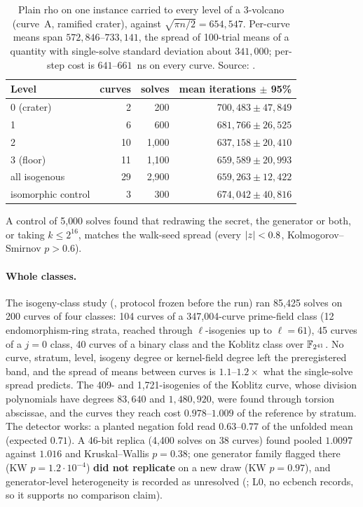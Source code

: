 \begin{table}[t]
\centering\small
\begin{tabular}{@{}lrrr@{}}
\toprule
Level & curves & solves & mean iterations $\pm$ 95\% \\
\midrule
0 (crater) & 2 & 200 & $700{,}483\pm47{,}849$ \\
1 & 6 & 600 & $681{,}766\pm26{,}525$ \\
2 & 10 & 1{,}000 & $637{,}158\pm20{,}410$ \\
3 (floor) & 11 & 1{,}100 & $659{,}589\pm20{,}993$ \\
all isogenous & 29 & 2{,}900 & $659{,}263\pm12{,}422$ \\
isomorphic control & 3 & 300 & $674{,}042\pm40{,}816$ \\
\bottomrule
\end{tabular}
\caption[]{Plain rho on one instance carried to every level of a 3-volcano
(curve~A, ramified crater), against $\sqrt{\pi n/2}=654{,}547$. Per-curve
means span $572{,}846$--$733{,}141$, the spread of 100-trial means of a
quantity with single-solve standard deviation about $341{,}000$; per-step
cost is $641$--$661$~ns on every curve. Source:
.}
\label{tab:rv-volcano}
\end{table}

A control of 5{,}000 solves found that redrawing the secret, the generator
or both, or taking $k\le2^{16}$, matches the walk-seed spread (every
$\lvert z \rvert<0.8$, Kolmogorov--Smirnov $p>0.6$).

\paragraph{Whole classes.} The isogeny-class study
(, protocol frozen before the run) ran
85{,}425 solves on 200 curves of four classes: 104 curves of a
347{,}004-curve prime-field class (12 endomorphism-ring strata, reached
through $\ell$-isogenies up to $\ell=61$), 45 curves of a $j=0$ class, 40
curves of a binary class and the Koblitz class over $\mathbb{F}_{2^{41}}$. No
curve, stratum, level, isogeny degree or kernel-field degree left the
preregistered band, and the spread of means between curves is $1.1$--$1.2\times$
what the single-solve spread predicts. The 409- and 1{,}721-isogenies of
the Koblitz curve, whose division polynomials have degrees $83{,}640$ and
$1{,}480{,}920$, were found through torsion abscissae, and the curves they
reach cost $0.978$--$1.009$ of the reference by stratum. The detector works:
a planted negation fold read $0.63$--$0.77$ of the unfolded mean (expected
$0.71$). A 46-bit replica (4{,}400 solves on 38 curves) found pooled $1.0097$
against $1.016$ and Kruskal--Wallis $p=0.38$; one generator family flagged
there (KW $p=1.2\cdot10^{-4}$) \textbf{did not replicate} on a new draw (KW
$p=0.97$), and generator-level heterogeneity is recorded as unresolved
(; L0, no ecbench records, so
it supports no comparison claim).

